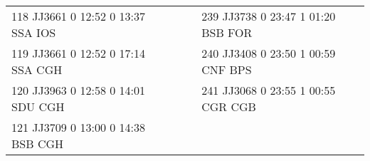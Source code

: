 \begin{scriptsize}
\begin{longtable}{l c c l}
118 JJ3661 0 12:52 0 13:37 SSA IOS & & & 239 JJ3738 0 23:47 1 01:20 BSB FOR \\

119 JJ3661 0 12:52 0 17:14 SSA CGH & & & 240 JJ3408 0 23:50 1 00:59 CNF BPS \\

120 JJ3963 0 12:58 0 14:01 SDU CGH & & & 241 JJ3068 0 23:55 1 00:55 CGR CGB \\

121 JJ3709 0 13:00 0 14:38 BSB CGH & & & \\


\end{longtable}

\end{scriptsize}
